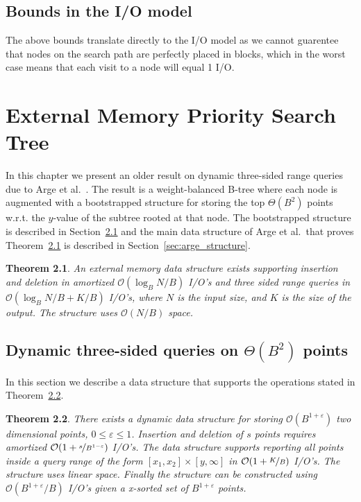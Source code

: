 \documentclass[twoside,11pt,openright]{report}
\def \epsilon {\varepsilon}
\newtheorem{theorem}{Theorem}
\begin{document}
\section{Bounds in the I/O model}
The above bounds translate directly to the I/O model as we cannot guarentee that nodes on the search path are perfectly placed in blocks, which in the worst case means that each visit to a node will equal 1 I/O.

\chapter{External Memory Priority Search Tree}
\label{chp:arge_pst}
In this chapter we present an older result on dynamic three-sided range queries due to Arge et al.~\cite{arge_samoladas_vitter_1999}.
The result is a weight-balanced B-tree where each node is augmented with a bootstrapped structure for storing the top $\Theta(B^2)$ points w.r.t. the $y$-value of the subtree rooted at that node. The bootstrapped structure is described in Section~\ref{sec:child_structure} and the main data structure of Arge et al.~that proves Theorem~\ref{thm:arge_structure} is described in Section~\ref{sec:arge_structure}.

\begin{theorem}
\label{thm:arge_structure}
An external memory data structure exists supporting insertion and deletion in amortized $\mathcal{O}(\log_B N/B)$ I/O's and three sided range queries in $\mathcal{O}(\log_B N/B + K/B)$ I/O's, where $N$ is the input size, and $K$ is the size of the output. The structure uses $\mathcal{O}(N/B)$ space.
\end{theorem}

\section{Dynamic three-sided queries on $\Theta(B^2)$ points}
\label{sec:child_structure}
In this section we describe a data structure that supports the operations stated in Theorem~\ref{thm:child_structure}.
\begin{theorem}
\label{thm:child_structure}
There exists a dynamic data structure for storing $\mathcal{O}(B^{1+\epsilon})$ two dimensional points, $0 \leq \epsilon \leq 1$.
Insertion and deletion of $s$ points requires amortized $\mathcal{O}(1+\nicefrac{s}{B^{1-\epsilon}})$ I/O's.
The data structure supports reporting all points inside a query range of the form $[x_1,x_2] \times [y,\infty]$ in $\mathcal{O}(1+\nicefrac{K}{B})$ I/O's.
The structure uses linear space.
Finally the structure can be constructed using $\mathcal{O}(B^{1+\epsilon} / B)$ I/O's given a x-sorted set of $B^{1+\epsilon}$ points.
\end{theorem}
\end{document}
